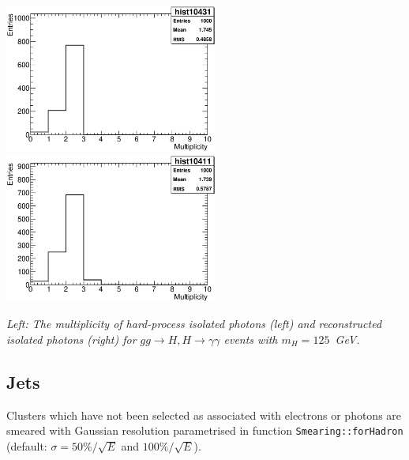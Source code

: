 \begin{Fighere}
\begin{center}
   \includegraphics[width=7.0cm,angle=0]{plot-HPisolPhotons.eps}
   \includegraphics[width=7.0cm,angle=0]{plot-recoPhotons.eps}
\end{center}
\caption{\em
Left: The multiplicity of  hard-process isolated photons (left) and reconstructed isolated photons (right) 
for $gg \to H, H \to \gamma \gamma$ events with $m_H=125$~GeV.
\label{FS2.2}} 
\end{Fighere}


\boldmath 
\subsection{Jets}
\unboldmath

Clusters which have not been selected as associated with electrons or
photons are smeared with Gaussian resolution parametrised in function
{\tt Smearing::forHadron} (default: $\sigma = 50\%/\sqrt{E}$ and $100\%/\sqrt{E}$).
 


